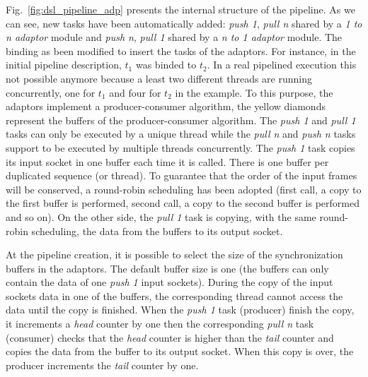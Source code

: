 Fig.~\ref{fig:dsl_pipeline_adp} presents the internal structure of the pipeline.
As we can see, new tasks have been automatically added: \emph{push 1},
\emph{pull n} shared by a \emph{1 to n adaptor} module and \emph{push n},
\emph{pull 1} shared by a \emph{n to 1 adaptor} module. The binding as been
modified to insert the tasks of the adaptors. For instance, in the initial
pipeline description, $t_1$ was binded to $t_2$. In a real pipelined execution
this not possible anymore because a least two different threads are running
concurrently, one for $t_1$ and four for $t_2$ in the example. To this purpose,
the adaptors implement a producer-consumer algorithm, the yellow diamonds
represent the buffers of the producer-consumer algorithm. The \emph{push 1} and
\emph{pull 1} tasks can only be executed by a unique thread while the \emph{pull
n} and \emph{push n} tasks support to be executed by multiple threads
concurrently. The \emph{push 1} task copies its input socket in one buffer
each time it is called. There is one buffer per duplicated sequence (or thread).
To guarantee that the order of the input frames will be conserved, a round-robin
scheduling has been adopted (first call, a copy to the first buffer is
performed, second call, a copy to the second buffer is performed and so on). On
the other side, the \emph{pull 1} task is copying, with the same round-robin
scheduling, the data from the buffers to its output socket.

At the pipeline creation, it is possible to select the size of the
synchronization buffers in the adaptors. The default buffer size is one (the
buffers can only contain the data of one \emph{push 1} input sockets). During
the copy of the input sockets data in one of the buffers, the corresponding
thread cannot access the data until the copy is finished. When the \emph{push 1}
task (producer) finish the copy, it increments a \emph{head} counter by one then
the corresponding \emph{pull n} task (consumer) checks that the \emph{head}
counter is higher than the \emph{tail} counter and copies the data from the
buffer to its output socket. When this copy is over, the producer increments
the \emph{tail} counter by one.

